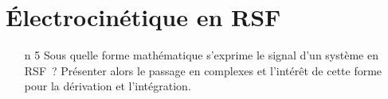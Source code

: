 \documentclass[a4paper, 10pt, final, garamond]{book}
\begin{document}
\setcounter{chapter}{9}


\chapter{Électrocinétique en RSF}

\begin{enumerate}[label=\sqenumi]
	\item[n]{5}%
	      Sous quelle forme mathématique s'exprime le signal d'un système en RSF~?
	      Présenter alors le passage en complexes et l'intérêt de cette forme pour
	      la dérivation et l'intégration.
	      \smallbreak
	      \begin{isd}
		      \vspace{-15pt}
		      \vspace{-15pt}
		      \tcblower
		      \vspace{-15pt}
	      \end{isd}

\end{enumerate}
\end{document}
